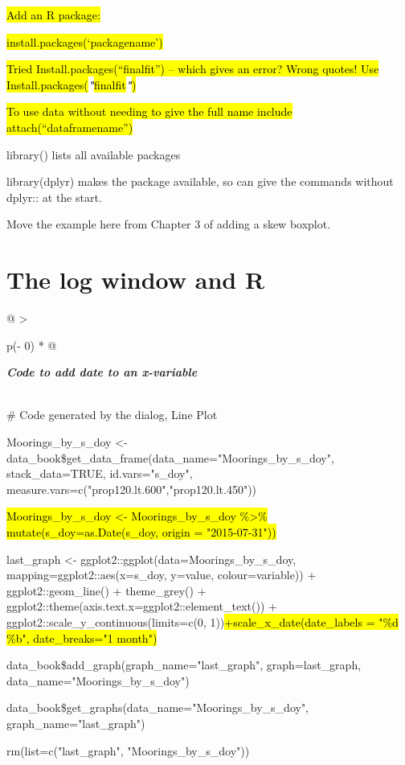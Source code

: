 \documentclass[
  letterpaper,
  DIV=11,
  numbers=noendperiod]{scrreprt}
\begin{document}
\hl{Add an R package:}

\hl{install.packages(`packagename')}

\hl{Tried Install.packages(``finalfit'') -- which gives an error? Wrong
quotes! Use
Install.packages(}\textbf{\emph{"}}\hl{finalfit}\textbf{\emph{"}}\hl{)}

\hl{To use data without needing to give the full name include
attach(``dataframename'')}

library() lists all available packages

library(dplyr) makes the package available, so can give the commands
without dplyr:: at the start.

Move the example here from Chapter 3 of adding a skew boxplot.

\section{The log window and R}\label{the-log-window-and-r}

\begin{longtable}[]{@{}
  >{\raggedright\arraybackslash}p{(\columnwidth - 0\tabcolsep) * }@{}}
\toprule\noalign{}
\begin{minipage}[b]{\linewidth}\raggedright
\textbf{\emph{Code to add date to an x-variable}}
\end{minipage} \\
\midrule\noalign{}
\endhead
\bottomrule\noalign{}
\endlastfoot
\# Code generated by the dialog, Line Plot

Moorings\_by\_s\_doy \textless-
data\_book\$get\_data\_frame(data\_name="Moorings\_by\_s\_doy",
stack\_data=TRUE, id.vars="s\_doy",
measure.vars=c("prop120.lt.600","prop120.lt.450"))

\hl{Moorings\_by\_s\_doy \textless- Moorings\_by\_s\_doy
\%\textgreater\% mutate(s\_doy=as.Date(s\_doy, origin = "2015-07-31"))}

last\_graph \textless- ggplot2::ggplot(data=Moorings\_by\_s\_doy,
mapping=ggplot2::aes(x=s\_doy, y=value, colour=variable)) +
ggplot2::geom\_line() + theme\_grey() +
ggplot2::theme(axis.text.x=ggplot2::element\_text()) +
ggplot2::scale\_y\_continuous(limits=c(0,
1))\hl{+scale\_x\_date(date\_labels = "\%d \%b", date\_breaks="1
month")}

data\_book\$add\_graph(graph\_name="last\_graph", graph=last\_graph,
data\_name="Moorings\_by\_s\_doy")

data\_book\$get\_graphs(data\_name="Moorings\_by\_s\_doy",
graph\_name="last\_graph")

rm(list=c("last\_graph", "Moorings\_by\_s\_doy")) \\
\end{longtable}
\end{document}
